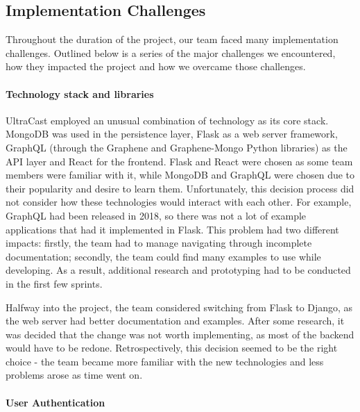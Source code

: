 \documentclass[../report.tex]{subfiles}
\begin{document}
\subsection{Implementation Challenges} \label{ssec:backend_challenges}

Throughout the duration of the project, our team faced many implementation challenges.
Outlined below is a series of the major challenges we encountered, how they impacted the project and how we overcame those challenges.

\paragraph{Technology stack and libraries}

UltraCast employed an unusual combination of technology as its core stack.
MongoDB was used in the persistence layer, Flask as a web server framework, GraphQL (through the Graphene and Graphene-Mongo Python libraries) as the API layer and React for the frontend.
Flask and React were chosen as some team members were familiar with it, while MongoDB and GraphQL were chosen due to their popularity and desire to learn them.
Unfortunately, this decision process did not consider how these technologies would interact with each other.
For example, GraphQL had been released in 2018, so there was not a lot of example applications that had it implemented in Flask.
This problem had two different impacts: firstly, the team had to manage navigating through incomplete documentation; secondly, the team could find many examples to use while developing.
As a result, additional research and prototyping had to be conducted in the first few sprints.

Halfway into the project, the team considered switching from Flask to Django, as the web server had better documentation and examples.
After some research, it was decided that the change was not worth implementing, as most of the backend would have to be redone.
Retrospectively, this decision seemed to be the right choice - the team became more familiar with the new technologies and less problems arose as time went on.

\paragraph{User Authentication}
\end{document}
